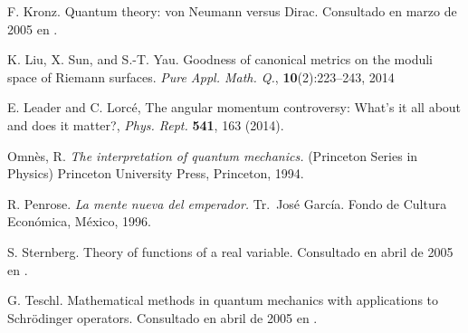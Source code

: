\begin{thebibliography}{99}
 F. Kronz. Quantum theory: von {Neumann} versus {Dirac}. Consultado en marzo de 2005 en .

 K. Liu, X. Sun, and S.-T. Yau. Goodness of canonical metrics on the moduli space of Riemann surfaces. \textit{Pure Appl. Math. Q.}, \textbf{10}(2):223--243, 2014

 E. Leader and C. Lorcé, The angular momentum controversy: What's it all about and does it matter?, \textit{Phys. Rept.} \textbf{541}, 163 (2014).

 Omn\`{e}s, R. \textit{The interpretation of quantum mechanics.} (Princeton Series in Physics) Princeton University Press, Princeton, 1994.

 R. Penrose. \textit{La mente nueva del emperador.} Tr.~José García. Fondo de Cultura Económica, México, 1996.

 S. Sternberg. Theory of functions of a real variable. Consultado en abril de 2005 en .

 G. Teschl. Mathematical methods in quantum mechanics with applications to {Schrödinger} operators. Consultado en abril de 2005 en .

\end{thebibliography}
